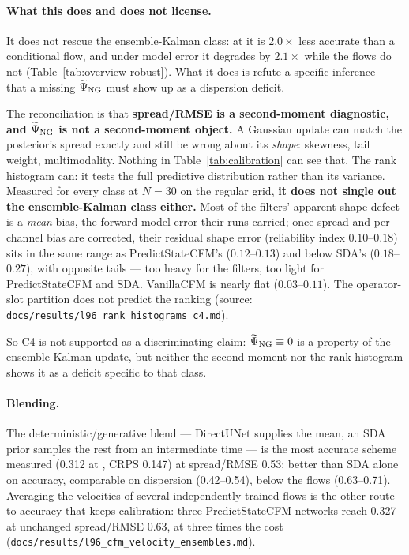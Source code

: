 \paragraph{What this does and does not license.}
It does not rescue the ensemble-Kalman class: at \Sz{} it is $2.0\times$ less
accurate than a conditional flow, and under model error it degrades by
$2.1\times$ while the flows do not
(Table~\ref{tab:overview-robust}). What it does is refute a specific inference
--- that a missing $\widetilde{\Psi}_{\mathrm{NG}}$ must show up as a dispersion deficit.

The reconciliation is that \textbf{spread/RMSE is a second-moment diagnostic, and
$\widetilde{\Psi}_{\mathrm{NG}}$ is not a second-moment object.} A Gaussian update can match the
posterior's spread exactly and still be wrong about its \emph{shape}: skewness,
tail weight, multimodality. Nothing in Table~\ref{tab:calibration} can see that.
The rank histogram can: it tests the full predictive distribution rather than its
variance. Measured for every class at $N=30$ on the regular grid, \textbf{it does
not single out the ensemble-Kalman class either.} Most of the filters' apparent
shape defect is a \emph{mean} bias, the forward-model error their \Sz{} runs
carried; once spread and per-channel bias are corrected, their residual shape
error (reliability index $0.10$--$0.18$) sits in the same range as
PredictStateCFM's ($0.12$--$0.13$) and below SDA's ($0.18$--$0.27$), with
opposite tails --- too heavy for the filters, too light for PredictStateCFM and
SDA. VanillaCFM is nearly flat ($0.03$--$0.11$). The operator-slot partition does
not predict the ranking (source: \texttt{docs/results/l96\_rank\_histograms\_c4.md}).

So C4 is not supported as a discriminating claim: $\widetilde{\Psi}_{\mathrm{NG}} \equiv 0$ is a property
of the ensemble-Kalman update, but neither the second moment nor the rank
histogram shows it as a deficit specific to that class.

\paragraph{Blending.}
The deterministic/generative blend --- DirectUNet supplies the mean, an SDA
prior samples the rest from an intermediate time --- is the most accurate scheme
measured (0.312 at \Sz{}, CRPS 0.147) at spread/RMSE 0.53: better than SDA alone
on accuracy, comparable on dispersion (0.42--0.54), below the flows (0.63--0.71).
Averaging the velocities of several independently trained flows is the other
route to accuracy that keeps calibration: three PredictStateCFM networks reach
0.327 at unchanged spread/RMSE 0.63, at three times the cost
(\texttt{docs/results/l96\_cfm\_velocity\_ensembles.md}).

